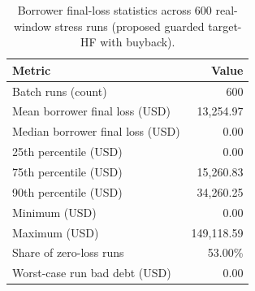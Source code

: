 \begin{table}[h!]
\centering
\caption{Borrower final-loss statistics across 600 real-window stress runs (proposed guarded target-HF with buyback).}
\label{tab:borrower_loss_batch_120}
\begin{tabular}{@{}lr@{}}
\toprule
Metric & Value \\
\midrule
Batch runs (count) & 600 \\
Mean borrower final loss (USD) & 13,254.97 \\
Median borrower final loss (USD) & 0.00 \\
25th percentile (USD) & 0.00 \\
75th percentile (USD) & 15,260.83 \\
90th percentile (USD) & 34,260.25 \\
Minimum (USD) & 0.00 \\
Maximum (USD) & 149,118.59 \\
Share of zero-loss runs & 53.00\% \\
Worst-case run bad debt (USD) & 0.00 \\
\bottomrule
\end{tabular}
\end{table}
